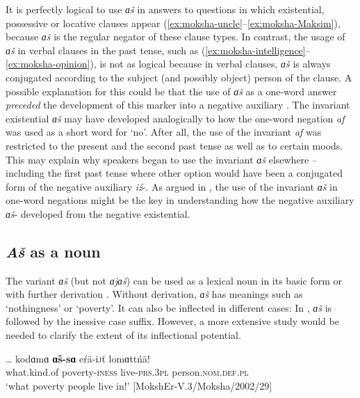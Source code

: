 \documentclass[output=paper,colorlinks,citecolor=brown,draft,draftmode]{langscibook}
\begin{document}
  It is perfectly logical to use \textit{ɑš} in answers to questions in which existential, possessive or locative clauses appear (\ref{ex:moksha-uncle}--\ref{ex:moksha-Maksim}), because \textit{ɑš} is the regular negator of these clause types. In contrast, the usage of \textit{ɑš} in verbal clauses in the past tense, such as (\ref{ex:moksha-intelligence}--\ref{ex:moksha-opinion}), is not as logical because in verbal clauses, \textit{ɑš} is always conjugated according to the subject (and possibly object) person of the clause. A possible explanation for this could be that the use of \textit{ɑš} as a one-word answer \textit{preceded} the development of this marker into a negative auxiliary \citep[272--275]{Hamari2007}. The invariant existential \textit{ɑš} may have developed analogically to how the one-word negation \textit{af} was used as a short word for `no'. After all, the use of the invariant \textit{af} was restricted to the present and the second past tense as well as to certain moods. This may explain why speakers began to use the invariant \textit{ɑš} elsewhere -- including the first past tense where other option would have been a conjugated form of the negative auxiliary \textit{iź}-. As argued in , the use of the invariant \textit{ɑš} in one-word negations might be the key in understanding how the negative auxiliary \textit{ɑš}- developed from the negative existential.

\subsection{\textit{Aš} as a noun}\label{sec:2:5.5}

The variant \textit{ɑš} (but not \textit{ɑjɑš}) can be used as a lexical noun in its basic form or with further derivation \citep[268--270]{Hamari2007}. Without derivation, \textit{ɑš} has meanings such as `nothingness' or `poverty'. It can also be inflected in different cases: In , \textit{ɑš} is followed by the inessive case suffix. However, a more extensive study would be needed to clarify the extent of its inflectional potential. 

\ea\label{ex:moksha-poverty}
\gll \ob\ldots\cb{} kodɑmɑ \textbf{ɑš-sɑ} eŕä-i\textsc{j}ť lomɑttńä!\\
{} what.kind.of poverty-\textsc{iness} live-\textsc{prs.3pl} person.\textsc{nom.def.pl}\\
\glt `what poverty people live in!' [MokshEr-V.3/Moksha/2002/29]
\z
\end{document}
